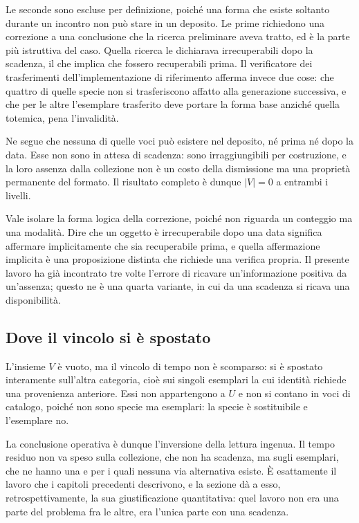 Le seconde sono escluse per definizione, poiché una forma che esiste soltanto durante un incontro non può stare in un deposito. Le prime richiedono una correzione a una conclusione che la ricerca preliminare aveva tratto, ed è la parte più istruttiva del caso. Quella ricerca le dichiarava irrecuperabili dopo la scadenza, il che implica che fossero recuperabili prima. Il verificatore dei trasferimenti dell'implementazione di riferimento afferma invece due cose: che quattro di quelle specie non si trasferiscono affatto alla generazione successiva, e che per le altre l'esemplare trasferito deve portare la forma base anziché quella totemica, pena l'invalidità.

Ne segue che nessuna di quelle voci può esistere nel deposito, né prima né dopo la data. Esse non sono in attesa di scadenza: sono irraggiungibili per costruzione, e la loro assenza dalla collezione non è un costo della dismissione ma una proprietà permanente del formato. Il risultato completo è dunque $|V| = 0$ a entrambi i livelli.

Vale isolare la forma logica della correzione, poiché non riguarda un conteggio ma una modalità. Dire che un oggetto è irrecuperabile dopo una data significa affermare implicitamente che sia recuperabile prima, e quella affermazione implicita è una proposizione distinta che richiede una verifica propria. Il presente lavoro ha già incontrato tre volte l'errore di ricavare un'informazione positiva da un'assenza; questo ne è una quarta variante, in cui da una scadenza si ricava una disponibilità.

\subsection*{Dove il vincolo si è spostato}

L'insieme $V$ è vuoto, ma il vincolo di tempo non è scomparso: si è spostato interamente sull'altra categoria, cioè sui singoli esemplari la cui identità richiede una provenienza anteriore. Essi non appartengono a $U$ e non si contano in voci di catalogo, poiché non sono specie ma esemplari: la specie è sostituibile e l'esemplare no.

La conclusione operativa è dunque l'inversione della lettura ingenua. Il tempo residuo non va speso sulla collezione, che non ha scadenza, ma sugli esemplari, che ne hanno una e per i quali nessuna via alternativa esiste. È esattamente il lavoro che i capitoli precedenti descrivono, e la sezione dà a esso, retrospettivamente, la sua giustificazione quantitativa: quel lavoro non era una parte del problema fra le altre, era l'unica parte con una scadenza.

